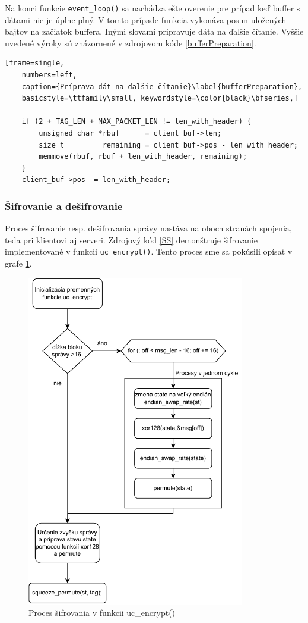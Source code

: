 Na konci funkcie \lstinline|event_loop()| sa nachádza ešte overenie pre prípad keď buffer s dátami nie je úplne plný. V tomto prípade funkcia vykonáva posun uložených bajtov na začiatok buffera. Inými slovami pripravuje dáta na ďalšie čítanie. Vyššie uvedené výroky sú znázornené v zdrojovom kóde \ref{bufferPreparation}.

\begin{lstlisting}[frame=single,
	numbers=left,
	caption={Príprava dát na ďalšie čítanie}\label{bufferPreparation},
	basicstyle=\ttfamily\small, keywordstyle=\color{black}\bfseries,]
	
	if (2 + TAG_LEN + MAX_PACKET_LEN != len_with_header) { 
		unsigned char *rbuf      = client_buf->len;
		size_t         remaining = client_buf->pos - len_with_header;
		memmove(rbuf, rbuf + len_with_header, remaining);
	}
	client_buf->pos -= len_with_header;
\end{lstlisting}
 
\subsubsection{Šifrovanie a dešifrovanie}
Proces šifrovanie resp. dešifrovania správy nastáva na oboch stranách spojenia, teda pri klientovi aj serveri. Zdrojový kód \ref{SS} demonštruje šifrovanie implementované v funkcii \lstinline|uc_encrypt()|. Tento proces sme sa pokúsili opísať v grafe \ref{fc3}. 

\begin{figure}
	\centering
	\includegraphics[width=0.85\textwidth]{figures/fc3}
	\caption{Proces šifrovania v funkcii uc\_encrypt()}
	\label{fc3}
\end{figure}

